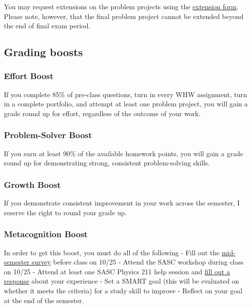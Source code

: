 \documentclass[
  letterpaper,
  DIV=11,
  numbers=noendperiod]{scrartcl}
\begin{document}
You may request extensions on the problem projects using the
\href{https://forms.gle/eFx7y7FoSdoukKGC6}{extension form}. Please note,
however, that the final problem project cannot be extended beyond the
end of final exam period.

\subsection{Grading boosts}\label{grading-boosts}

\subsubsection{Effort Boost}

If you complete 85\% of pre-class questions, turn in every WHW
assignment, turn in a complete portfolio, and attempt at least one
problem project, you will gain a grade round up for effort, regardless
of the outcome of your work.

\subsubsection{Problem-Solver Boost}

If you earn at least 90\% of the available homework points, you will
gain a grade round up for demonstrating strong, consistent
problem-solving skills.

\subsubsection{Growth Boost}

If you demonstrate consistent improvement in your work across the
semester, I reserve the right to round your grade up.

\subsubsection{Metacognition Boost}

In order to get this boost, you must do all of the following - Fill out
the \href{https://forms.gle/K3kqhLWRtxuAd45U8}{mid-semester survey}
before class on 10/25 - Attend the SASC workshop during class on 10/25 -
Attend at least one SASC Physics 211 help session and
\href{https://forms.gle/qudMKQ4FJX76pBef9}{fill out a response} about
your experience - Set a SMART goal (this will be evaluated on whether it
meets the criteria) for a study skill to improve - Reflect on your goal
at the end of the semester.
\end{document}

